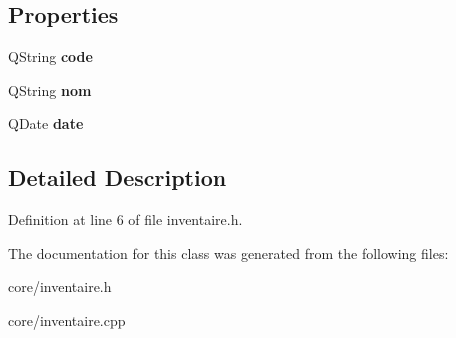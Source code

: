 \subsection*{Properties}
\begin{DoxyCompactItemize}
\item 
\hypertarget{class_inventaire_aeb3861e8a528858bd46af1fe298a5cd2}{
QString {\bfseries code}}
\label{class_inventaire_aeb3861e8a528858bd46af1fe298a5cd2}

\item 
\hypertarget{class_inventaire_a566226c89f519a91b876631e53aa4e8c}{
QString {\bfseries nom}}
\label{class_inventaire_a566226c89f519a91b876631e53aa4e8c}

\item 
\hypertarget{class_inventaire_a3c35c1ba27edb65e974e6aaad2678fdf}{
QDate {\bfseries date}}
\label{class_inventaire_a3c35c1ba27edb65e974e6aaad2678fdf}

\end{DoxyCompactItemize}


\subsection{Detailed Description}


Definition at line 6 of file inventaire.h.



The documentation for this class was generated from the following files:\begin{DoxyCompactItemize}
\item 
core/inventaire.h\item 
core/inventaire.cpp\end{DoxyCompactItemize}
